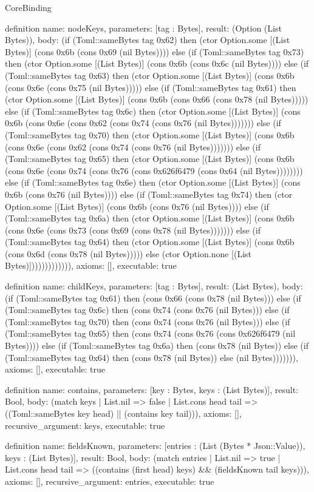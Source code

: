 \begin{lexlean}{CoreBinding}
\begin{semanticmodule}
definition{
 name: nodeKeys,
 parameters: [tag : Bytes],
 result: (Option (List Bytes)),
 body: (if (Toml::sameBytes tag 0x62) then (ctor Option.some [(List Bytes)] (cons 0x6b (cons 0x69 (nil Bytes)))) else (if (Toml::sameBytes tag 0x73) then (ctor Option.some [(List Bytes)] (cons 0x6b (cons 0x6c (nil Bytes)))) else (if (Toml::sameBytes tag 0x63) then (ctor Option.some [(List Bytes)] (cons 0x6b (cons 0x6e (cons 0x75 (nil Bytes))))) else (if (Toml::sameBytes tag 0x61) then (ctor Option.some [(List Bytes)] (cons 0x6b (cons 0x66 (cons 0x78 (nil Bytes))))) else (if (Toml::sameBytes tag 0x6c) then (ctor Option.some [(List Bytes)] (cons 0x6b (cons 0x6e (cons 0x62 (cons 0x74 (cons 0x76 (nil Bytes))))))) else (if (Toml::sameBytes tag 0x70) then (ctor Option.some [(List Bytes)] (cons 0x6b (cons 0x6e (cons 0x62 (cons 0x74 (cons 0x76 (nil Bytes))))))) else (if (Toml::sameBytes tag 0x65) then (ctor Option.some [(List Bytes)] (cons 0x6b (cons 0x6e (cons 0x74 (cons 0x76 (cons 0x626f6479 (cons 0x64 (nil Bytes)))))))) else (if (Toml::sameBytes tag 0x6e) then (ctor Option.some [(List Bytes)] (cons 0x6b (cons 0x76 (nil Bytes)))) else (if (Toml::sameBytes tag 0x74) then (ctor Option.some [(List Bytes)] (cons 0x6b (cons 0x76 (nil Bytes)))) else (if (Toml::sameBytes tag 0x6a) then (ctor Option.some [(List Bytes)] (cons 0x6b (cons 0x6e (cons 0x73 (cons 0x69 (cons 0x78 (nil Bytes))))))) else (if (Toml::sameBytes tag 0x64) then (ctor Option.some [(List Bytes)] (cons 0x6b (cons 0x6d (cons 0x78 (nil Bytes))))) else (ctor Option.none [(List Bytes)])))))))))))),
 axioms: [],
 executable: true
}

definition{
 name: childKeys,
 parameters: [tag : Bytes],
 result: (List Bytes),
 body: (if (Toml::sameBytes tag 0x61) then (cons 0x66 (cons 0x78 (nil Bytes))) else (if (Toml::sameBytes tag 0x6c) then (cons 0x74 (cons 0x76 (nil Bytes))) else (if (Toml::sameBytes tag 0x70) then (cons 0x74 (cons 0x76 (nil Bytes))) else (if (Toml::sameBytes tag 0x65) then (cons 0x74 (cons 0x76 (cons 0x626f6479 (nil Bytes)))) else (if (Toml::sameBytes tag 0x6a) then (cons 0x78 (nil Bytes)) else (if (Toml::sameBytes tag 0x64) then (cons 0x78 (nil Bytes)) else (nil Bytes))))))),
 axioms: [],
 executable: true
}

definition{
 name: contains,
 parameters: [key : Bytes, keys : (List Bytes)],
 result: Bool,
 body: (match keys | List.nil => false | List.cons head tail => ((Toml::sameBytes key head) || (contains key tail))),
 axioms: [],
 recursive_argument: keys,
 executable: true
}

definition{
 name: fieldsKnown,
 parameters: [entries : (List (Bytes * Json::Value)), keys : (List Bytes)],
 result: Bool,
 body: (match entries | List.nil => true | List.cons head tail => ((contains (first head) keys) && (fieldsKnown tail keys))),
 axioms: [],
 recursive_argument: entries,
 executable: true
}


\end{semanticmodule}
\end{lexlean}
